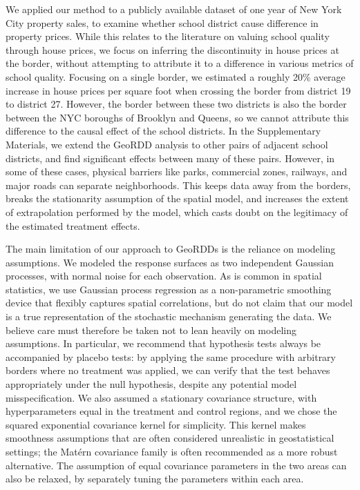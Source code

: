 We applied our method to a publicly available dataset of one year of New York City property sales, to examine whether school district cause difference in property prices.
While this relates to the literature on valuing school quality through house prices, we focus on inferring the discontinuity in house prices at the border, without attempting to attribute it to a difference in various metrics of school quality.
Focusing on a single border, we estimated a roughly 20\% average increase in house prices per square foot when crossing the border from district 19 to district 27.
However, the border between these two districts is also the border between the NYC boroughs of Brooklyn and Queens, so we cannot attribute this difference to the causal effect of the school districts.
In the Supplementary Materials, we extend the GeoRDD analysis to other pairs of adjacent school districts, and find significant effects between many of these pairs.
However, in some of these cases, physical barriers like parks, commercial zones, railways, and major roads can separate neighborhoods. 
This keeps data away from the borders, breaks the stationarity assumption of the spatial model, and increases the extent of extrapolation performed by the model, which casts doubt on the legitimacy of the estimated treatment effects.

The main limitation of our approach to GeoRDDs is the reliance on modeling assumptions.
We modeled the response surfaces as two independent Gaussian processes, with \iid{} normal noise for each observation.
As is common in spatial statistics, we use Gaussian process regression as a non-parametric smoothing device that flexibly captures spatial correlations, but do not claim that our model is a true representation of the stochastic mechanism generating the data.
We believe care must therefore be taken not to lean heavily on modeling assumptions.
In particular, we recommend that hypothesis tests always be accompanied by placebo tests:
by applying the same procedure with arbitrary borders where no treatment was applied, we can verify that the test behaves appropriately under the null hypothesis, despite any potential model misspecification.
We also assumed a stationary covariance structure, with hyperparameters equal in the treatment and control regions, and we chose the squared exponential covariance kernel for simplicity.
This kernel makes smoothness assumptions that are often considered unrealistic in geostatistical settings; the Mat\'ern covariance family is often recommended as a more robust alternative.
The assumption of equal covariance parameters in the two areas can also be relaxed, by separately tuning the parameters within each area.

